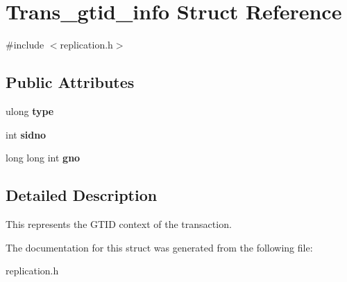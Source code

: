 \hypertarget{structTrans__gtid__info}{}\section{Trans\+\_\+gtid\+\_\+info Struct Reference}
\label{structTrans__gtid__info}


{\ttfamily \#include $<$replication.\+h$>$}

\subsection*{Public Attributes}
\begin{DoxyCompactItemize}
\item 
\mbox{\label{structTrans__gtid__info_a96d503c2d6d1476d3fe6676cc9aba5af}} 
ulong {\bfseries type}
\item 
\mbox{\label{structTrans__gtid__info_a2c5b6c7784543178f23424f9398fa70e}} 
int {\bfseries sidno}
\item 
\mbox{\label{structTrans__gtid__info_a701dce87a99d819e3cd9873b81c8f2f4}} 
long long int {\bfseries gno}
\end{DoxyCompactItemize}


\subsection{Detailed Description}
This represents the G\+T\+ID context of the transaction. 

The documentation for this struct was generated from the following file\+:\begin{DoxyCompactItemize}
\item 
replication.\+h\end{DoxyCompactItemize}
